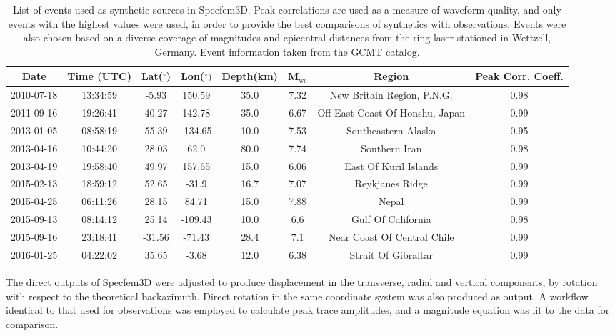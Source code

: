 \documentclass{gji}
\begin{document}
\begin{table*}
\begin{minipage}{150mm}
	\begin{center}
		\begin{tabular}{ |c|c|c|c|c|c|c|c| } 
		\bf{Date} & \bf{Time (UTC)} & \bf{Lat($^\circ$)} & \bf{Lon($^\circ)$} & \bf{Depth(km)} & \bf{M$_{\text{wc}}$} &\bf{Region} &\bf{Peak Corr. Coeff.}\\ \hline
	2010-07-18 & 13:34:59 & -5.93 & 150.59 & 35.0 & 7.32 & New Britain Region, P.N.G. & 0.98\\
	2011-09-16 & 19:26:41 & 40.27 & 142.78 & 35.0 & 6.67 & Off East Coast Of Honshu, Japan & 0.99\\
	2013-01-05 & 08:58:19 & 55.39 & -134.65 & 10.0 & 7.53 & Southeastern Alaska & 0.95\\
	2013-04-16 & 10:44:20 & 28.03 & 62.0 & 80.0 & 7.74 & Southern Iran & 0.98\\
	2013-04-19 & 19:58:40 & 49.97 & 157.65 & 15.0 & 6.06 & East Of Kuril Islands & 0.99\\
	2015-02-13 & 18:59:12 & 52.65 & -31.9 & 16.7 & 7.07 & Reykjanes Ridge & 0.99\\
	2015-04-25 & 06:11:26 & 28.15 & 84.71 & 15.0 & 7.88 & Nepal & 0.99\\
	2015-09-13 & 08:14:12 & 25.14 & -109.43 & 10.0 & 6.6 & Gulf Of California & 0.98\\
	2015-09-16 & 23:18:41 & -31.56 & -71.43 & 28.4 & 7.1 & Near Coast Of Central Chile & 0.99\\
	2016-01-25 & 04:22:02 & 35.65 & -3.68 & 12.0 & 6.38 & Strait Of Gibraltar & 0.99\\
		\end{tabular}
    		\caption{List of events used as synthetic sources in Specfem3D. Peak correlations are used as a measure of waveform quality, and only events with the highest values were used, in order to provide the best comparisons of synthetics with observations. Events were also chosen based on a diverse coverage of magnitudes and epicentral distances from the ring laser stationed in Wettzell, Germany. Event information taken from the GCMT catalog.}
		\label{tab:syn_events}
	\end{center}
	\end{minipage}
\end{table*}

The direct outputs of Specfem3D were adjusted to produce displacement in the transverse, radial and vertical components, by rotation with respect to the theoretical backazimuth. Direct rotation in the same coordinate system was also produced as output. A workflow identical to that used for observations was employed to calculate peak trace amplitudes, and a magnitude equation was fit to the data for comparison.
\end{document}
